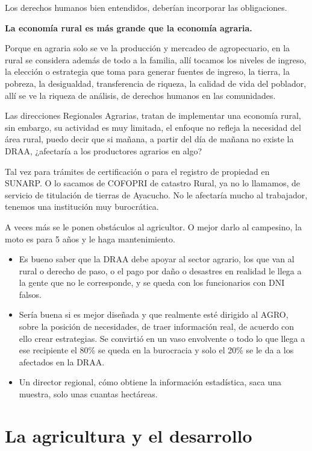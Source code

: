 \documentclass[
  a4paper,
]{article}
\begin{document}
Los derechos humanos bien entendidos, deberían incorporar las
obligaciones.

\textbf{La economía rural es más grande que la economía agraria.}

Porque en agraria solo se ve la producción y mercadeo de agropecuario,
en la rural se considera además de todo a la familia, allí tocamos los
niveles de ingreso, la elección o estrategia que toma para generar
fuentes de ingreso, la tierra, la pobreza, la desigualdad, transferencia
de riqueza, la calidad de vida del poblador, allí se ve la riqueza de
análisis, de derechos humanos en las comunidades.

Las direcciones Regionales Agrarias, tratan de implementar una economía
rural, sin embargo, su actividad es muy limitada, el enfoque no refleja
la necesidad del área rural, puedo decir que si mañana, a partir del día
de mañana no existe la DRAA, ¿afectaría a los productores agrarios en
algo?

Tal vez para trámites de certificación o para el registro de propiedad
en SUNARP. O lo sacamos de COFOPRI de catastro Rural, ya no lo llamamos,
de servicio de titulación de tierras de Ayacucho. No le afectaría mucho
al trabajador, tenemos una institución muy burocrática.

A veces más se le ponen obstáculos al agricultor. O mejor darlo al
campesino, la moto es para 5 años y le haga mantenimiento.

\begin{itemize}
\item
  Es bueno saber que la DRAA debe apoyar al sector agrario, los que van
  al rural o derecho de paso, o el pago por daño o desastres en realidad
  le llega a la gente que no le corresponde, y se queda con los
  funcionarios con DNI falsos.
\item
  Sería buena si es mejor diseñada y que realmente esté dirigido al
  AGRO, sobre la posición de necesidades, de traer información real, de
  acuerdo con ello crear estrategias. Se convirtió en un vaso envolvente
  o todo lo que llega a ese recipiente el 80\% se queda en la burocracia
  y solo el 20\% se le da a los afectados en la DRAA.
\item
  Un director regional, cómo obtiene la información estadística, saca
  una muestra, solo unas cuantas hectáreas.
\end{itemize}

\hypertarget{la-agricultura-y-el-desarrollo}{%
\section{La agricultura y el
desarrollo}\label{la-agricultura-y-el-desarrollo}}
\end{document}

